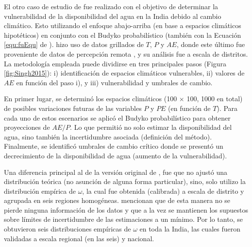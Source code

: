 \documentclass[12pt]{article}
\begin{document}
\clearpage


El otro caso de estudio de \citet{Singh2015} fue realizado con el objetivo de determinar la vulnerabilidad de la disponibilidad del agua en la India debido al cambio climático. Esto utilizando el enfoque abajo-arriba (en base a espacios climáticos hipotéticos) en conjunto con el Budyko probabilístico (también con la Ecuación \ref{equ:fuEqu} de \citet{Fu1981}). \citet{Singh2015} hizo uso de datos grillados de $T$, $P$ y $AE$, donde este último fue proveniente de datos de percepción remota \citep{zhang2016review}, y su análisis fue a escala de distritos. La metodología empleada puede dividirse en tres principales pasos (Figura \ref{fig:Singh2015}): i) identificación de espacios climáticos vulnerables, ii) valores de $AE$ en función del paso i), y iii) vulnerabilidad y umbrales de cambio. 

\thispagestyle{empty}



En primer lugar, se determinó los espacios climáticos (100 $\times$ 100, 1000 en total) de posibles variaciones futuras de las variables $P$ y $PE$ (en función de $T$). Para cada uno de estos escenarios se aplicó el Budyko probabilístico para obtener proyecciones de $AE/P$. Lo que permitió no solo estimar la disponibilidad del agua, sino también la incertidumbre asociada (definición del método). Finalmente, se identificó umbrales de cambio crítico donde se presentó un decrecimiento de la disponibilidad de agua (aumento de la vulnerabilidad).

\thispagestyle{empty}

Una diferencia principal al de la versión original de \citet{Greve2015}, fue que \citet{Singh2015} no ajustó una distribución teórica (no asunción de alguna forma particular), sino, solo utilizo la distribución empírica de $\omega$, la cual fue obtenida (calibrada) a escala de distrito y agrupada en seis regiones homogéneas. \citet{Singh2015} mencionan que de esta manera no se pierde ninguna información de los datos y que a la vez se mantienen los supuestos sobre límites de incertidumbre de las estimaciones a un mínimo. Por lo tanto, se obtuvieron seis distribuciones empíricas de $\omega$ en toda la India, las cuales fueron validadas a escala regional (en las seis) y nacional.
\end{document}
